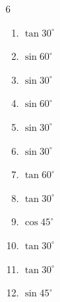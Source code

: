 \begin{multicols}{6}
\begin{enumerate}
  \item $\displaystyle \tan{30^\circ}$


  \item $\displaystyle \sin{60^\circ}$


  \item $\displaystyle \sin{30^\circ}$


  \item $\displaystyle \sin{60^\circ}$


  \item $\displaystyle \sin{30^\circ}$


  \item $\displaystyle \sin{30^\circ}$


  \item $\displaystyle \tan{60^\circ}$


  \item $\displaystyle \tan{30^\circ}$


  \item $\displaystyle \cos{45^\circ}$


  \item $\displaystyle \tan{30^\circ}$


  \item $\displaystyle \tan{30^\circ}$


\columnbreak %

  \item $\displaystyle \sin{45^\circ}$



\end{enumerate}
\end{multicols}
